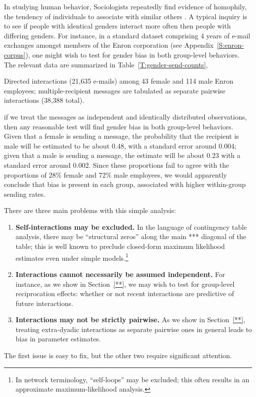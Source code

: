 \documentclass[aoas,preprint]{imsart}
\begin{document}
In studying human behavior, Sociologists repeatedly find evidence of homophily,
the tendency of individuals to associate with similar others
\cite{mcpherson2001birds}. A typical inquiry is to see if people with identical
genders interact more often then people with differing genders.  For instance, in a standard dataset comprising 4 years of e-mail exchanges amongst members of the Enron corporation (see Appendix~\ref{S:enron-corpus}), one might wish to test for gender bias in both group-level behaviors. The relevant data are summarized in Table~\ref{T:gender-send-counts},
\begin{table}[t]
    
    \caption{
        Directed interactions (21,635 e-mails) among 43 female and 114 male Enron employees; multiple-recipient messages are tabulated as separate pairwise interactions (38,388 total).
    }
    \label{T:gender-send-counts}
\end{table}
if we treat the messages as independent and identically distributed observations,
then any reasonable test will find gender bias in both group-level behaviors.
Given that a female is sending a message, the probability that the recipient
is male will be estimated to be about 0.48, with a standard error around
0.004; given that a male is sending a message, the estimate will be about
0.23 with a standard error around 0.002.  Since these proportions fail to agree with the proportions of 28\% female and 72\% male employees, we would apparently conclude that bias is present in each group, associated with higher
within-group sending rates.

There are three main problems with this simple analysis:
\begin{enumerate}
    \item \textbf{Self-interactions may be excluded.} In the language of contingency table analysis, there may be ``structural zeros'' along the main *** diagonal of the table; this is well known to preclude closed-form maximum likelihood estimates even under simple models.\footnote{In network terminology, ``self-loops'' may be excluded; this often results in an approximate maximum-likelihood analysis.}

    \item \textbf{Interactions cannot necessarily be assumed independent.} For instance, as we show in Section~\ref{**}, we may wish to test for group-level reciprocation effects: whether or not recent interactions are predictive of future interactions.

    \item \textbf{Interactions may not be strictly pairwise.} As we show in Section~\ref{**}, treating extra-dyadic interactions as separate pairwise ones in general leads to bias in parameter estimates.
\end{enumerate}
The first issue is easy to fix, but the other two require significant
attention.
\end{document}
